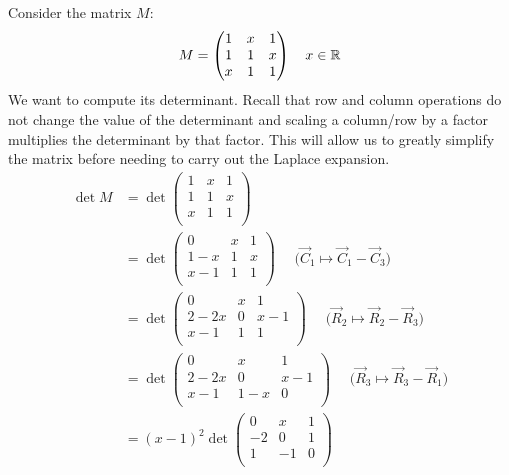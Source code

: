 \documentclass[../main.tex]{subfiles}
\begin{document}
\begin{example}
  \label{determinantExample}
  Consider the matrix $M$:
  \[
    M = \begin{pmatrix}
    1 & x & 1 \\
    1 & 1 & x \\
    x & 1 & 1 \\
    \end{pmatrix}
    \quad x \in \mathbb{R}
  \]
  We want to compute its determinant.
  Recall that row and column operations do not change the value of the determinant and scaling a column/row by a factor multiplies the determinant by that factor.
  This will allow us to greatly simplify the matrix before needing to carry out the Laplace expansion.
  \begin{align*}
    \det M &= \det \begin{pmatrix}
    1 & x & 1 \\
    1 & 1 & x \\
    x & 1 & 1 \\
    \end{pmatrix}\\
    &= \det \begin{pmatrix}
    0 & x & 1 \\
    1-x & 1 & x \\
    x-1 & 1 & 1 \\
    \end{pmatrix} \quad\text{ ($\vec{C}_1 \mapsto \vec{C}_1 - \vec{C}_3$)}\\
    &= \det \begin{pmatrix}
    0 & x & 1 \\
    2-2x & 0 & x - 1 \\
    x-1 & 1 & 1 \\
    \end{pmatrix} \quad\text{ ($\vec{R}_2 \mapsto \vec{R}_2 - \vec{R}_3$)}\\
    &= \det \begin{pmatrix}
    0 & x & 1 \\
    2-2x & 0 & x - 1 \\
    x-1 & 1-x & 0 \\
    \end{pmatrix} \quad\text{ ($\vec{R}_3 \mapsto \vec{R}_3 - \vec{R}_1$)}\\
    &= (x - 1)^2\det \begin{pmatrix}
    0 & x & 1 \\
    -2 & 0 & 1 \\
    1 & -1 & 0 \\

\end{pmatrix}
\end{align*}
\end{example}
\end{document}
